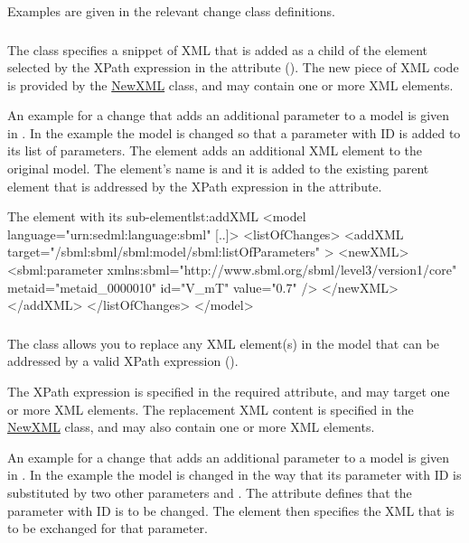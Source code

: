 Examples are given in the relevant change class definitions.


\subsubsection{}
\label{class:addXml}
The  class specifies a snippet of XML that is added as a child of the element selected by the XPath expression in the \hyperref[sec:changeTarget]{} attribute (). The new piece of XML code is provided by the \hyperref[sec:newXml]{NewXML} class, and may contain one or more XML elements.

An example for a change that adds an additional parameter to a model is given in . In the example the model is changed so that a parameter with ID  is added to its list of parameters. The  element adds an additional XML element to the original model. The element's name is  and it is added to the existing parent element  that is addressed by the XPath expression in the  attribute.

\begin{myXmlLst}{The  element with its  sub-element}{lst:addXML}
<model language="urn:sedml:language:sbml" [..]>
	<listOfChanges>
		<addXML target="/sbml:sbml/sbml:model/sbml:listOfParameters" >
			<newXML>
				<sbml:parameter xmlns:sbml="http://www.sbml.org/sbml/level3/version1/core"
				                metaid="metaid_0000010" id="V_mT" value="0.7" />
			</newXML>
		</addXML>
	</listOfChanges>
</model>
\end{myXmlLst}


\subsubsection{}
\label{class:changeXml}
The  class allows you to replace any XML element(s) in the model that can be addressed by a valid XPath expression ().

The XPath expression is specified in the required \hyperref[sec:changeTarget]{} attribute, and may target one or more XML elements. The replacement XML content is specified in the \hyperref[sec:newXml]{NewXML} class, and may also contain one or more XML elements.

An example for a change that adds an additional parameter to a model is given in . In the example the model is changed in the way that its parameter with ID  is substituted by two other parameters  and . The  attribute defines that the parameter with ID  is to be changed. The  element then specifies the XML that is to be exchanged for that parameter.

